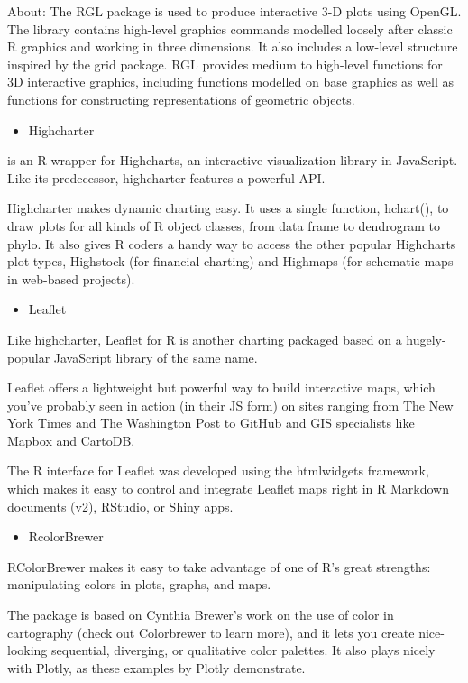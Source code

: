 \documentclass[
]{report}
\providecommand{\tightlist}{%
  \setlength{\itemsep}{0pt}\setlength{\parskip}{0pt}}
\begin{document}
About: The RGL package is used to produce interactive 3-D plots using OpenGL. The library contains high-level graphics commands modelled loosely after classic R graphics and working in three dimensions. It also includes a low-level structure inspired by the grid package. RGL provides medium to high-level functions for 3D interactive graphics, including functions modelled on base graphics as well as functions for constructing representations of geometric objects.

\begin{itemize}
\tightlist
\item
  Highcharter
\end{itemize}

is an R wrapper for Highcharts, an interactive visualization library in JavaScript. Like its predecessor, highcharter features a powerful API.

Highcharter makes dynamic charting easy. It uses a single function, hchart(), to draw plots for all kinds of R object classes, from data frame to dendrogram to phylo. It also gives R coders a handy way to access the other popular Highcharts plot types, Highstock (for financial charting) and Highmaps (for schematic maps in web-based projects).

\begin{itemize}
\tightlist
\item
  Leaflet
\end{itemize}

Like highcharter, Leaflet for R is another charting packaged based on a hugely-popular JavaScript library of the same name.

Leaflet offers a lightweight but powerful way to build interactive maps, which you've probably seen in action (in their JS form) on sites ranging from The New York Times and The Washington Post to GitHub and GIS specialists like Mapbox and CartoDB.

The R interface for Leaflet was developed using the htmlwidgets framework, which makes it easy to control and integrate Leaflet maps right in R Markdown documents (v2), RStudio, or Shiny apps.

\begin{itemize}
\tightlist
\item
  RcolorBrewer
\end{itemize}

RColorBrewer makes it easy to take advantage of one of R's great strengths: manipulating colors in plots, graphs, and maps.

The package is based on Cynthia Brewer's work on the use of color in cartography (check out Colorbrewer to learn more), and it lets you create nice-looking sequential, diverging, or qualitative color palettes. It also plays nicely with Plotly, as these examples by Plotly demonstrate.
\end{document}
